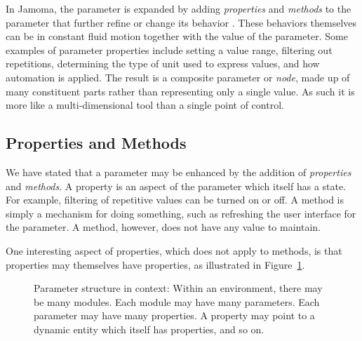 \documentclass{article}
\begin{document}
In Jamoma, the parameter is expanded by adding \emph{properties} and \emph{methods} to the parameter that further refine or change its behavior \cite{Place:2008}. These behaviors themselves can be in constant fluid motion together with the value of the parameter. Some examples of parameter properties include setting a value range, filtering out repetitions, determining the type of unit used to express values, and how automation is applied.  The result is a composite parameter or \emph{node}, made up of many constituent parts rather than representing only a single value. As such it is more like a multi-dimensional tool than a single point of control.

\subsection{Properties and Methods} %
\label{sec:properties_and_methods}

We have stated that a parameter may be enhanced by the addition of \emph{properties} and \emph{methods}. A property is an aspect of the parameter which itself has a state. For example, filtering of repetitive values can be turned on or off. A method is simply a mechanism for doing something, such as refreshing the user interface for the parameter. A method, however, does not have any value to maintain.

One interesting aspect of properties, which does not apply to methods, is that properties may themselves have properties, as illustrated in Figure~\ref{fig:structure}.

\begin{figure}[ht]
\centerline{}
\caption{Parameter structure in context: Within an environment, there may be many modules. Each module may have many parameters. Each parameter may have many properties. A property may point to a dynamic entity which itself has properties, and so on.}
\label{fig:structure}
\end{figure}
\end{document}
